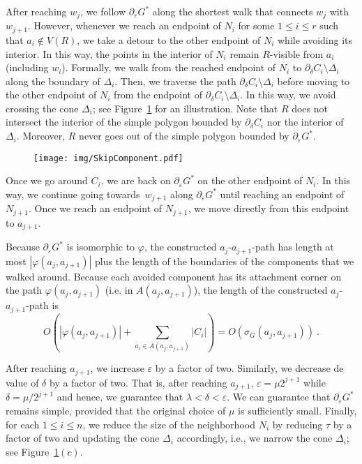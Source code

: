\documentclass[a4paper, 11pt]{article}
\begin{document}
After reaching $w_j$, we follow $\partial_\varepsilon G^*$ along the shortest walk that connects $w_j$ with $w_{j+1}$. 
However, whenever we reach an endpoint of $N_i$ for some $1\leq i\leq r$ such that $a_i\notin V(R)$, we take a detour to the other endpoint of $N_i$ while avoiding its interior. 
In this way, the points in the interior of $N_i$ remain $R$-visible from $a_i$ (including $w_i$). Formally, we walk from the reached endpoint of $N_i$ to $\partial_\delta C_i\setminus \Delta_i$ along the boundary of $\Delta_i$. Then, we traverse the path $\partial_\delta C_i\setminus \Delta_i$ before moving to the other endpoint of $N_i$ from the endpoint of $\partial_\delta C_i \setminus \Delta_i$. In this way, we avoid crossing the cone $\Delta_i$; see Figure~\ref{fig:Skip Component} for an illustration. 
Note that $R$ does not intersect the interior of the simple polygon bounded by $\partial_\delta C_i$ nor the interior of $\Delta_i$.
Moreover, $R$ never goes out of the simple polygon bounded by $\partial_\varepsilon G^*$.

\begin{figure}[tb]
\centering
\texttt{[image: img/SkipComponent.pdf]}
\caption{\small }
\label{fig:Skip Component}
\end{figure}

Once we go around $C_i$, we are back on $\partial_\varepsilon G^*$ on the other endpoint of $N_i$. In this way, we continue going towards~$w_{j+1}$ along $\partial_\varepsilon G^*$ until reaching an endpoint of $N_{j+1}$.
Once we reach an endpoint of $N_{j+1}$, we move directly from this endpoint to $a_{j+1}$.

Because $\partial_\varepsilon G^*$ is isomorphic to $\varphi$, the constructed $a_j$-$a_{j+1}$-path has length at most $|\varphi(a_j, a_{j+1})|$ plus the length of the boundaries of the components that we walked around. 
Because each avoided component has its attachment corner on the path $\varphi(a_j, a_{j+1})$ (i.e. in $A(a_j, a_{j+1})$), the length of the constructed $a_j$-$a_{j+1}$-path is $$O(|\varphi(a_j, a_{j+1})| + \sum_{a_i\in A(a_j, a_{j+1})} |C_i|) = O(\sigma_G(a_j, a_{j+1}))\ .$$

After reaching $a_{j+1}$, we increase $\varepsilon$ by a factor of two. Similarly, we decrease de value of $\delta$ by a factor of two. That is, after reaching $a_{j+1}$, $\varepsilon = \mu 2^{j+1}$ while $\delta = \mu/2^{j+1}$ and hence, we guarantee that $\lambda < \delta < \varepsilon$.
We can guarantee that $\partial_\varepsilon G^*$ remains simple, provided that the original choice of $\mu$ is sufficiently small. 
Finally, for each $1\leq i\leq n$, we reduce the size of the neighborhood $N_i$ by reducing $\tau$ by a factor of two and updating the cone $\Delta_i$ accordingly, i.e., we narrow the cone $\Delta_i$; see Figure~\ref{fig:Skip Component}$(c)$. 
\end{document}
